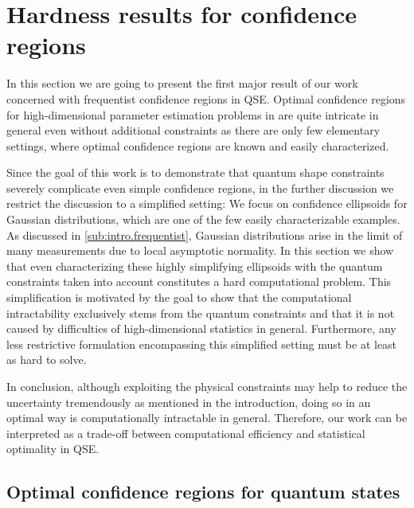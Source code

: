 









\section{Hardness results for confidence regions}
\label{sec:error.ortho}

In this section we are going to present the first major result of our work~\cite{Suess_2016_Error} concerned with frequentist confidence regions in QSE.
Optimal confidence regions for high-dimensional parameter estimation problems in are quite intricate in general even without additional constraints as there are only few elementary settings, where optimal confidence regions are known and easily characterized.

Since the goal of this work is to demonstrate that quantum shape constraints severely complicate even  simple confidence regions, in the further discussion we restrict the discussion to a simplified setting:
We focus on confidence ellipsoids for Gaussian distributions, which are one of the few easily characterizable examples.
As discussed in \cref{sub:intro.frequentist}, Gaussian distributions arise in the limit of many measurements due to local asymptotic normality.
In this section we show that even characterizing these highly simplifying ellipsoids with the quantum constraints taken into account constitutes a hard computational problem.
This simplification is motivated by the goal to show that the computational intractability exclusively stems from the quantum constraints and that it is not caused by difficulties of high-dimensional statistics in general.
Furthermore, any less restrictive formulation encompassing this simplified setting must be at least as hard to solve.

In conclusion, although exploiting the physical constraints may help to reduce the uncertainty tremendously as mentioned in the introduction, doing so in an optimal way is computationally intractable in general.
Therefore, our work can be interpreted as a trade-off between computational efficiency and statistical optimality in QSE.

\subsection{Optimal confidence regions for quantum states}
\label{sub:ortho.optimal}

